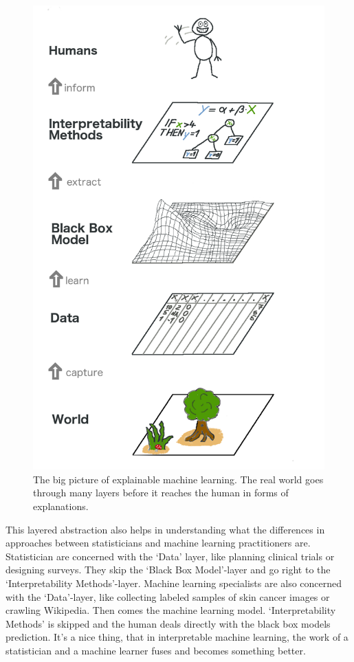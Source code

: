 \documentclass[12pt,]{krantz}
\theoremstyle{definition}
\theoremstyle{definition}
\theoremstyle{definition}
\theoremstyle{remark}
\begin{document}
\begin{figure}

{\centering \includegraphics[width=0.8\linewidth]{images/big-picture} 

}

\caption{The big picture of explainable machine learning. The real world goes through many layers before it reaches the human in forms of explanations.}\label{fig:bigpicture}
\end{figure}

This layered abstraction also helps in understanding what the
differences in approaches between statisticians and machine learning
practitioners are. Statistician are concerned with the `Data' layer,
like planning clinical trials or designing surveys. They skip the `Black
Box Model'-layer and go right to the `Interpretability Methods'-layer.
Machine learning specialists are also concerned with the `Data'-layer,
like collecting labeled samples of skin cancer images or crawling
Wikipedia. Then comes the machine learning model. `Interpretability
Methods' is skipped and the human deals directly with the black box
models prediction. It's a nice thing, that in interpretable machine
learning, the work of a statistician and a machine learner fuses and
becomes something better.
\end{document}
